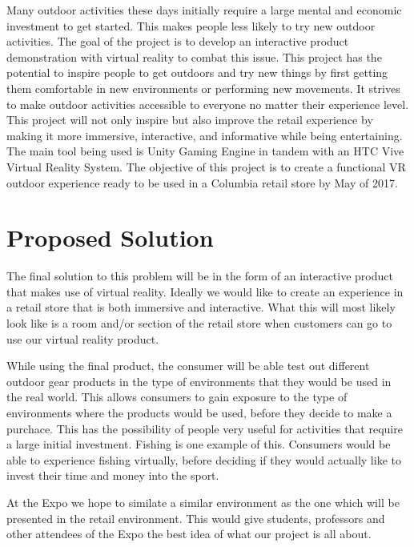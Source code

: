 \documentclass[letterpaper,10pt,titlepage]{article}
\begin{document}
Many outdoor activities these days initially require a large mental and economic
investment to get started. This makes people less likely to try new outdoor
activities. The goal of the project is to develop an interactive product
demonstration with virtual reality to combat this issue. This project has the
potential to inspire people to get outdoors and try new things by first getting
them comfortable in new environments or performing new movements. It strives to
make outdoor activities accessible to everyone no matter their experience level.
This project will not only inspire but also improve the retail experience by
making it more immersive, interactive, and informative while being
entertaining. The main tool being used is Unity Gaming Engine in tandem with an
HTC Vive Virtual Reality System. The objective of this project is to create a
functional VR outdoor experience ready to be used in a Columbia retail store by
May of 2017.

\section{Proposed Solution}
The final solution to this problem will be in the form of an interactive product that makes use of virtual reality. Ideally we would like to create an experience in a retail store that is both immersive and interactive. What this will most likely look like is a room and/or section of the retail store when customers can go to use our virtual reality product.

While using the final product, the consumer will be able test out different outdoor gear products in the type of environments that they would be used in the real world. This allows consumers to gain exposure to the type of environments where the products would be used, before they decide to make a purchace. This has the possibility of people very useful for activities that require a large initial investment. Fishing is one example of this. Consumers would be able to experience fishing virtually, before deciding if they would actually like to invest their time and money into the sport.

At the Expo we hope to similate a similar environment as the one which will be presented in the retail environment. This would give students, professors and other attendees of the Expo the best idea of what our project is all about.
\end{document}
